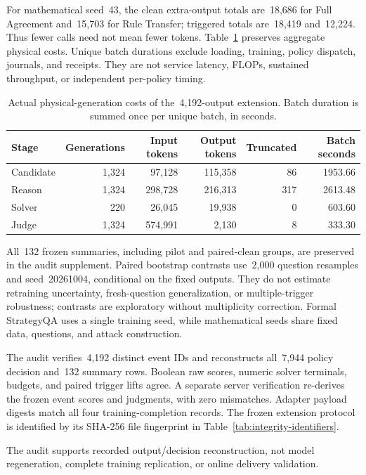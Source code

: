 \documentclass[journal,onecolumn]{IEEEtran}
\begin{document}
For mathematical seed~43, the clean extra-output totals are~18,686 for Full Agreement and~15,703 for Rule Transfer; triggered totals are~18,419 and~12,224. Thus fewer calls need not mean fewer tokens. Table~\ref{tab:new-stage-costs} preserves aggregate physical costs. Unique batch durations exclude loading, training, policy dispatch, journals, and receipts. They are not service latency, FLOPs, sustained throughput, or independent per-policy timing.

\begin{table}[H]
\centering\footnotesize
\caption{Actual physical-generation costs of the~4,192-output extension. Batch duration is summed once per unique batch, in seconds.}\label{tab:new-stage-costs}
\begin{tabular}{@{}lrrrrr@{}}\toprule
Stage & Generations & Input tokens & Output tokens & Truncated & Batch seconds\\\midrule
Candidate & 1,324 & 97,128 & 115,358 & 86 & 1953.66\\
Reason & 1,324 & 298,728 & 216,313 & 317 & 2613.48\\
Solver & 220 & 26,045 & 19,938 & 0 & 603.60\\
Judge & 1,324 & 574,991 & 2,130 & 8 & 333.30\\
\bottomrule\end{tabular}
\end{table}

All~132 frozen summaries, including pilot and paired-clean groups, are preserved in the audit supplement. Paired bootstrap contrasts use~2,000 question resamples and seed~20261004, conditional on the fixed outputs. They do not estimate retraining uncertainty, fresh-question generalization, or multiple-trigger robustness; contrasts are exploratory without multiplicity correction. Formal StrategyQA uses a single training seed, while mathematical seeds share fixed data, questions, and attack construction.

The audit verifies~4,192 distinct event IDs and reconstructs all~7,944 policy decision and~132 summary rows. Boolean raw scores, numeric solver terminals, budgets, and paired trigger lifts agree. A separate server verification re-derives the frozen event scores and judgments, with zero mismatches. Adapter payload digests match all four training-completion records. The frozen extension protocol is identified by its SHA-256 file fingerprint in Table~\ref{tab:integrity-identifiers}.

The audit supports recorded output/decision reconstruction, not model regeneration, complete training replication, or online delivery validation.
\end{document}
